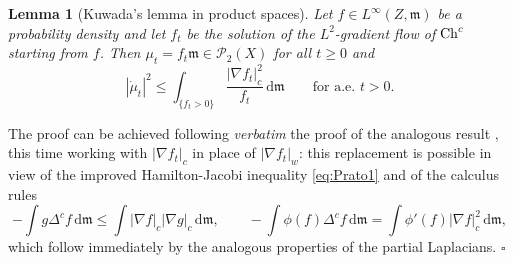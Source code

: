 \documentclass[reqno,11pt]{article}
\numberwithin{equation}{section}
\newcommand{\C}{\mathbb{C}}
\newcommand{\mm}{{\mbox{\boldmath$m$}}}
\renewcommand{\d}{{\mathrm d}}
\newcommand{\ProbabilitiesTwo}[1]{\mathscr P_2(#1)}     %
\newenvironment{proof}{\removelastskip\par\medskip   %
\noindent{\em Proof.}
\rm}{\penalty-20\null\hfill$\square$\par\medbreak}
\newtheorem{lemma}[theorem]{Lemma}
\newcommand{\probt}{\ProbabilitiesTwo}
\newcommand{\weakgrad}[1]{|\nabla #1|_w}                %
\newcommand{\cartgrad}[1]{|\nabla #1|_c}
\renewcommand{\C}{{\rm Ch}}
\newcommand{\Deltamc}{\Delta^c}
\renewcommand{\mm}{\mathfrak m}
\begin{document}
\begin{lemma}[Kuwada's lemma in product spaces]\label{le:keyimproved}
Let $f\in L^\infty(Z,\mm)$ be a probability density and let $f_t$ be
the solution of the $L^2$-gradient flow of $\C^c$ starting from $f$.
Then $\mu_t=f_t\mm\in\probt{X}$ for all $t\geq 0$ and
\begin{equation}\label{eq:Levico11}
|\dot\mu_t|^2\leq
\int_{\{f_t>0\}}\frac{\cartgrad{f_t}^2}{f_t}\,\d\mm\qquad\text{for
a.e.~$t>0$.}
\end{equation}
\end{lemma}
\begin{proof} The proof can be achieved following \emph{verbatim}
the proof of the analogous result
\cite[Lemma~6.1]{Ambrosio-Gigli-Savare11}, this time working with
$\cartgrad{f_t}$ in place of $\weakgrad{f_t}$: this replacement is
possible in view of the improved Hamilton-Jacobi inequality
\eqref{eq:Prato1} and of the calculus rules
\begin{equation}\label{eq:Prato3}
-\int g\Deltamc
f\,\d\mm\leq\int\cartgrad{f}\cartgrad{g}\,\d\mm,\qquad -\int
\phi(f)\Deltamc f\,\d\mm=\int\phi'(f)\cartgrad{f}^2\,\d\mm,
\end{equation}
which follow immediately by the analogous properties of the partial
Laplacians.
\end{proof}
\end{document}
